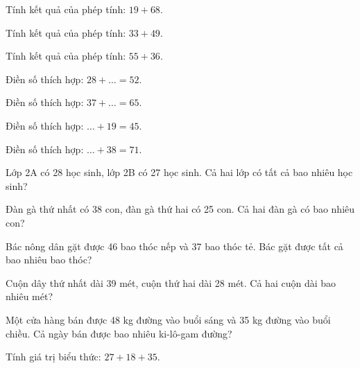 \begin{ex}
Tính kết quả của phép tính: $19 + 68$.
\end{ex}

\begin{ex}
Tính kết quả của phép tính: $33 + 49$.
\end{ex}

\begin{ex}
Tính kết quả của phép tính: $55 + 36$.
\end{ex}

\begin{ex}
Điền số thích hợp: $28 + \dots = 52$.
\end{ex}

\begin{ex}
Điền số thích hợp: $37 + \dots = 65$.
\end{ex}

\begin{ex}
Điền số thích hợp: $\dots + 19 = 45$.
\end{ex}

\begin{ex}
Điền số thích hợp: $\dots + 38 = 71$.
\end{ex}

\begin{ex}
Lớp 2A có 28 học sinh, lớp 2B có 27 học sinh. Cả hai lớp có tất cả bao nhiêu học sinh?
\end{ex}

\begin{ex}
Đàn gà thứ nhất có 38 con, đàn gà thứ hai có 25 con. Cả hai đàn gà có bao nhiêu con?
\end{ex}

\begin{ex}
Bác nông dân gặt được 46 bao thóc nếp và 37 bao thóc tẻ. Bác gặt được tất cả bao nhiêu bao thóc?
\end{ex}

\begin{ex}
Cuộn dây thứ nhất dài 39 mét, cuộn thứ hai dài 28 mét. Cả hai cuộn dài bao nhiêu mét?
\end{ex}

\begin{ex}
Một cửa hàng bán được 48 kg đường vào buổi sáng và 35 kg đường vào buổi chiều. Cả ngày bán được bao nhiêu ki-lô-gam đường?
\end{ex}

\begin{ex}
Tính giá trị biểu thức: $27 + 18 + 35$.
\end{ex}
